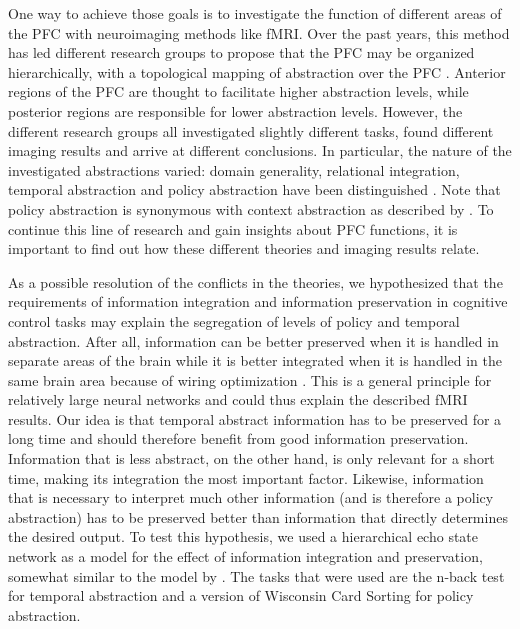 \documentclass[10pt,a4paper]{report}
\begin{document}
One way to achieve those goals is to investigate the function of different areas of the PFC with neuroimaging methods like fMRI. Over the past years, this method has led different research groups to propose that the PFC may be organized hierarchically, with a topological mapping of abstraction over the PFC \citep{Koechlin2007, Badre2007, Reynolds2012, Botvinick2007, O'Reilly2010a}. Anterior regions of the PFC are thought to facilitate higher abstraction levels, while posterior regions are responsible for lower abstraction levels. However, the different research groups all investigated slightly different tasks, found different imaging results and arrive at different conclusions. In particular, the nature of the investigated abstractions varied: domain generality, relational integration, temporal abstraction and policy abstraction have been distinguished \citep{Badre2009, Reynolds2009}. Note that policy abstraction is synonymous with context abstraction as described by \citet{Koechlin2003}. To continue this line of research and gain insights about PFC functions, it is important to find out how these different theories and imaging results relate.

As a possible resolution of the conflicts in the theories, we hypothesized that the requirements of information integration and information preservation in cognitive control tasks may explain the segregation of levels of policy and temporal abstraction. After all, information can be better preserved when it is handled in separate areas of the brain while it is better integrated when it is handled in the same brain area because of wiring optimization \citep{Sporns2011a}. This is a general principle for relatively large neural networks and could thus explain the described fMRI results. Our idea is that temporal abstract information has to be preserved for a long time and should therefore benefit from good information preservation. Information that is less abstract, on the other hand, is only relevant for a short time, making its integration the most important factor. Likewise, information that is necessary to interpret much other information (and is therefore a policy abstraction) has to be preserved better than information that directly determines the desired output. To test this hypothesis, we used a hierarchical echo state network as a model for the effect of information integration and preservation, somewhat similar to the model by \citet{Dominey1995}. The tasks that were used are the n-back test for temporal abstraction and a version of Wisconsin Card Sorting for policy abstraction. 
\end{document}
